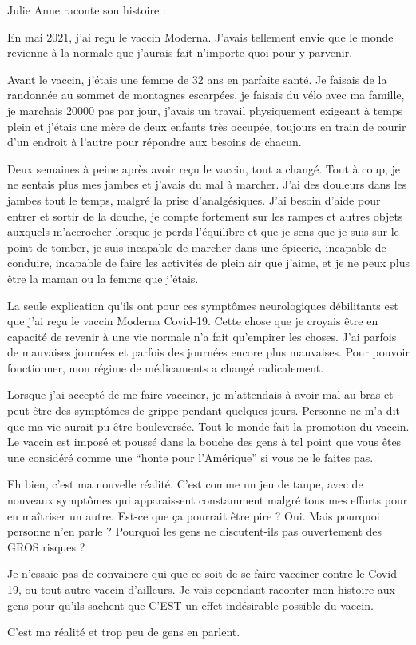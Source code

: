Julie Anne raconte son histoire :

En mai 2021, j'ai reçu le vaccin Moderna. J'avais tellement envie que le monde
revienne à la normale que j'aurais fait n'importe quoi pour y parvenir.

Avant le vaccin, j'étais une femme de 32 ans en parfaite santé. Je faisais de la
randonnée au sommet de montagnes escarpées, je faisais du vélo avec ma famille,
je marchais 20000 pas par jour, j'avais un travail physiquement exigeant à temps
plein et j'étais une mère de deux enfants très occupée, toujours en train de
courir d'un endroit à l'autre pour répondre aux besoins de chacun.

Deux semaines à peine après avoir reçu le vaccin, tout a changé. Tout à coup, je
ne sentais plus mes jambes et j'avais du mal à marcher. J'ai des douleurs dans
les jambes tout le temps, malgré la prise d'analgésiques. J'ai besoin d'aide
pour entrer et sortir de la douche, je compte fortement sur les rampes et autres
objets auxquels m'accrocher lorsque je perds l'équilibre et que je sens que je
suis sur le point de tomber, je suis incapable de marcher dans une épicerie,
incapable de conduire, incapable de faire les activités de plein air que j'aime,
et je ne peux plus être la maman ou la femme que j'étais.

La seule explication qu'ils ont pour ces symptômes neurologiques débilitants est
que j'ai reçu le vaccin Moderna Covid-19. Cette chose que je croyais être en
capacité de revenir à une vie normale n'a fait qu'empirer les choses. J'ai
parfois de mauvaises journées et parfois des journées encore plus
mauvaises. Pour pouvoir fonctionner, mon régime de médicaments a changé
radicalement.

Lorsque j'ai accepté de me faire vacciner, je m'attendais à avoir mal au bras et
peut-être des symptômes de grippe pendant quelques jours. Personne ne m'a dit
que ma vie aurait pu être bouleversée. Tout le monde fait la promotion du
vaccin. Le vaccin est imposé et poussé dans la bouche des gens à tel point que
vous êtes une considéré comme une “honte pour l'Amérique” si vous ne le faites
pas.

Eh bien, c'est ma nouvelle réalité. C'est comme un jeu de taupe, avec de
nouveaux symptômes qui apparaissent constamment malgré tous mes efforts pour en
maîtriser un autre. Est-ce que ça pourrait être pire ? Oui. Mais pourquoi
personne n'en parle ? Pourquoi les gens ne discutent-ils pas ouvertement des
GROS risques ?

Je n'essaie pas de convaincre qui que ce soit de se faire vacciner contre le
Covid-19, ou tout autre vaccin d'ailleurs. Je vais cependant raconter mon
histoire aux gens pour qu'ils sachent que C'EST un effet indésirable possible du
vaccin.

C'est ma réalité et trop peu de gens en parlent.


